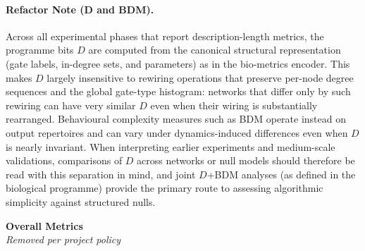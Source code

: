 \documentclass[11pt]{article}
\begin{document}
\paragraph{Refactor Note (D and BDM).} Across all experimental phases that report description-length metrics, the programme bits \(D\) are computed from the canonical structural representation (gate labels, in-degree sets, and parameters) as in the bio-metrics encoder. This makes \(D\) largely insensitive to rewiring operations that preserve per-node degree sequences and the global gate-type histogram: networks that differ only by such rewiring can have very similar \(D\) even when their wiring is substantially rearranged. Behavioural complexity measures such as BDM operate instead on output repertoires and can vary under dynamics-induced differences even when \(D\) is nearly invariant. When interpreting earlier experiments and medium-scale validations, comparisons of \(D\) across networks or null models should therefore be read with this separation in mind, and joint \(D\)+BDM analyses (as defined in the biological programme) provide the primary route to assessing algorithmic simplicity against structured nulls.\\
\begin{center}
\textbf{Overall Metrics}\\
\emph{Removed per project policy}
\end{center}
\end{document}
